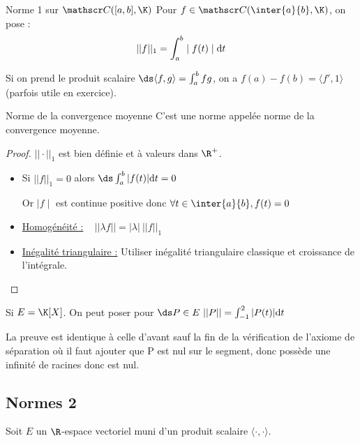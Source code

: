 \begin{definition}{Norme 1 sur $\mathscr C([a, b], \K)$}{}
    Pour $f \in \mathscr C(\inter{a}{b}, \K)$, on pose :
    \[||f||_1 = \int_{a }^{b } \mid f(t) \mid \text d t\]
\end{definition}

\begin{remarque}
    Si on prend le produit scalaire $\ds \langle f, g \rangle = \int_{a}^{b} fg$, on a 
    $f(a)-f(b) =  \langle f', 1 \rangle $ (parfois utile en exercice). 
\end{remarque}

\begin{theoreme}{Norme de la convergence moyenne}{}
    C'est une norme appelée norme de la convergence moyenne. 
\end{theoreme}

\begin{proof}
    $||\cdot ||_1$ est bien définie et à valeurs dans $\R^+$.
    
    \begin{itemize}
        \item Si $||f||_1 = 0$ alors $\ds \int_{a }^{b } |f(t)| \text d t = 0$

        Or $\mid f \mid $ est continue positive donc $\forall t \in \inter{a}{b}, f(t) = 0$

        \item \uline{Homogénéité :} ~ $|| \lambda f || = |\lambda| ~ ||f||_1$ 

        \item \uline{Inégalité triangulaire :} Utiliser inégalité triangulaire classique et croissance de l'intégrale.     
    \end{itemize}
\end{proof}

\begin{exemple}
    Si $E = \K[X]$.
    On peut poser pour $\ds P \in E~||P|| = \int_{-1}^{2} |P(t)| \text d t$

    La preuve est identique à celle d'avant sauf la fin de la vérification de l'axiome de séparation 
    où il faut ajouter que P est nul sur le segment, donc possède une infinité de racines donc est nul. 
\end{exemple}

\subsection{Normes 2}

Soit $E$ un $\R$-espace vectoriel muni d'un produit scalaire $\langle \cdot , \cdot \rangle$.

